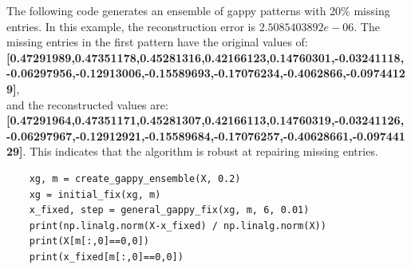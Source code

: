 \documentclass{article}
\begin{document}
The following code generates an ensemble of gappy patterns with 20\% missing entries. In this example, the reconstruction error is $2.5085403892e-06$. The missing entries in the first pattern have the original values of:\newline \textbf{[0.47291989,0.47351178,0.45281316,0.42166123,0.14760301,-0.03241118,\\-0.06297956,-0.12913006,-0.15589693,-0.17076234,-0.4062866,-0.09744129]},\\ and the reconstructed values are:\newline \textbf{[0.47291964,0.47351171,0.45281307,0.42166113,0.14760319,-0.03241126,\\-0.06297967,-0.12912921,-0.15589684,-0.17076257,-0.40628661,-0.09744129]}. This indicates that the algorithm is robust at repairing missing entries. 
\begin{lstlisting}
	xg, m = create_gappy_ensemble(X, 0.2)
	xg = initial_fix(xg, m)
	x_fixed, step = general_gappy_fix(xg, m, 6, 0.01)
	print(np.linalg.norm(X-x_fixed) / np.linalg.norm(X))
	print(X[m[:,0]==0,0])
	print(x_fixed[m[:,0]==0,0])
\end{lstlisting}
\end{document}
